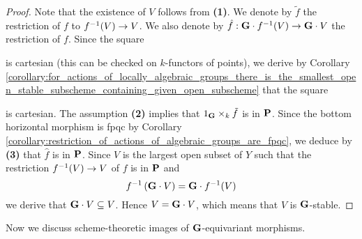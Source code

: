 \begin{proof}
Note that the existence of $V$ follows from \textbf{(1)}. We denote by $\tilde{f}$ the restriction of $f$ to $f^{-1}(V)\rightarrow V$. We also denote by $\hat{f}:\mathbf{G}\cdot f^{-1}(V)\rightarrow \mathbf{G}\cdot V$ the restriction of $f$.  Since the square
\begin{center}
\end{center}
is cartesian (this can be checked on $k$-functors of points), we derive by Corollary \ref{corollary:for_actions_of_locally_algebraic_groups_there_is_the_smallest_open_stable_subscheme_containing_given_open_subscheme} that the square
\begin{center}
\end{center}
is cartesian. The assumption \textbf{(2)} implies that $1_{\mathbf{G}}\times_k\tilde{f}$ is in $\mathbf{P}$. Since the bottom horizontal morphism is fpqc by Corollary \ref{corollary:restriction_of_actions_of_algebraic_groups_are_fpqc}, we deduce by \textbf{(3)} that $\hat{f}$ is in $\mathbf{P}$. Since $V$ is the largest open subset of $Y$ such that the restriction $f^{-1}(V)\rightarrow V$ of $f$ is in $\mathbf{P}$ and
$$f^{-1}\left(\mathbf{G}\cdot V\right) = \mathbf{G}\cdot f^{-1}(V)$$
we derive that $\mathbf{G}\cdot V \subseteq V$. Hence $V = \mathbf{G}\cdot V$, which means that $V$ is $\mathbf{G}$-stable.
\end{proof}
\noindent
Now we discuss scheme-theoretic images of $\mathbf{G}$-equivariant morphisms.

